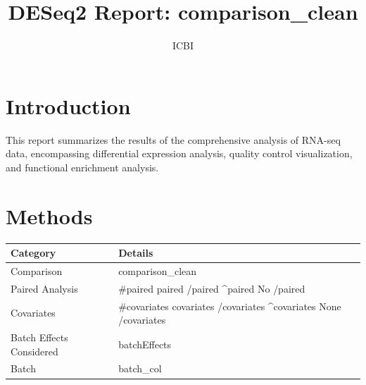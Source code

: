 \documentclass{article}
\title{ DESeq2 Report: {{comparison_clean}} }
\author{ICBI}
\begin{document}
\maketitle

\section*{Introduction}
This report summarizes the results of the comprehensive analysis of RNA-seq data,
encompassing differential expression analysis, quality control visualization, and functional
enrichment analysis.

\section*{Methods}
\begin{longtable}{ll}
    \hline
    Category & Details \\
    \hline
    Comparison & {{comparison_clean}} \\
    Paired Analysis & {{#paired}} {{paired}} {{/paired}} {{^paired}} No {{/paired}} \\
    Covariates & {{#covariates}} {{covariates}} {{/covariates}} {{^covariates}} None {{/covariates}} \\
    Batch Effects Considered & {{batchEffects}} \\
    Batch & {{batch_col}} \\
    \hline
\end{longtable}
\end{document}
